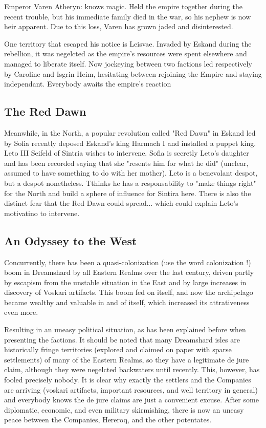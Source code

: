 Emperor Varen Atheryn: knows magic. Held the empire together during the recent trouble, but his immediate family died in the war, so his nephew is now heir apparent. Due to this loss, Varen has grown jaded and disinterested.

One territory that escaped his notice is Leisvae. Invaded by Eskand during the rebellion, it was negelcted as the empire's resources were spent elsewhere and managed to liberate itself. Now jockeying between two factions led respectively by Caroline and Isgrin Heim, hesitating between rejoining the Empire and staying independant. Everybody awaits the empire's reaction

\subsection{The Red Dawn}

Meanwhile, in the North, a popular revolution called "Red Dawn" in Eskand led by Sofia recently deposed Eskand's king Harmach I and installed a puppet king. Leto III Seifeld of Sintria wishes to intervene. Sofia is secretly Leto's daughter and has been recorded saying that she "resents him for what he did" (unclear, assumed to have something to do with her mother). Leto is a benevolant despot, but a despot nonetheless. Tthinks he has a responsability to "make things right" for the North and build a sphere of influence for Sintira here. There is also the distinct fear that the Red Dawn could spread... which could explain Leto's motivatino to intervene.

\subsection{An Odyssey to the West}
 
Concurrently, there has been a quasi-colonization (use the word colonization !) boom in Dreamshard by all Eastern Realms over the last century, driven partly by escapism from the unstable situation in the East and by large increases in discovery of Voskari artifacts. This boom fed on itself, and now the archipelago became wealthy and valuable in and of itself, which increased its attrativeness even more.

Resulting in an uneasy political situation, as has been explained before when presenting the factions. It should be noted that many Dreamshard isles are historically fringe territories (explored and claimed on paper with sparse settlements) of many of the Eastern Realms, so they have a legitimate de jure claim, although they were negelcted backwaters until recently. This, however, has fooled precisely nobody. It is clear why exactly the settlers and the Companies are arriving (voskari artifacts, important resources, and well territory in general) and everybody knows the de jure claims are just a convenient excuse. After some diplomatic, economic, and even military skirmishing, there is now an uneasy peace between the Companies, Hereroq, and the other potentates.

